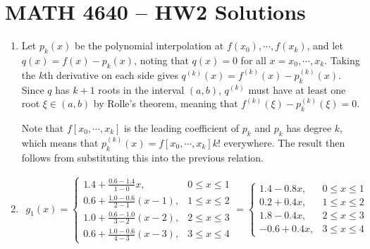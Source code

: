\documentclass[a4paper,12pt]{article}
\begin{document}
\section*{MATH 4640 -- HW2 Solutions}
\begin{enumerate}
    \item
        Let $p_k(x)$ be the polynomial interpolation at $f(x_0), \cdots, f(x_k)$, and let $q(x) = f(x) - p_k(x)$, noting that $q(x) = 0$ for all $x = x_0, \cdots, x_k$. Taking the $k$th derivative on each side gives $q^{(k)}(x) = f^{(k)}(x) - p_k^{(k)}(x)$. Since $q$ has $k + 1$ roots in the interval $(a, b)$, $q^{(k)}$ must have at least one root $\xi \in (a, b)$ by Rolle's theorem, meaning that $f^{(k)}(\xi) - p_k^{(k)}(\xi) = 0$. \par
        Note that $f[x_0, \cdots, x_k]$ is the leading coefficient of $p_k$ and $p_k$ has degree $k$, which means that $p_k^{(k)}(x) = f[x_0, \cdots, x_k]k!$ everywhere. The result then follows from substituting this into the previous relation.

    \item
        \begin{align*}
            g_1(x) = \begin{cases}
                1.4 + \frac{0.6 - 1.4}{1 - 0}x, &0 \leq x \leq 1 \\
                0.6 + \frac{1.0 - 0.6}{2 - 1}(x - 1), &1 \leq x \leq 2 \\
                1.0 + \frac{0.6 - 1.0}{3 - 2}(x - 2), &2 \leq x \leq 3 \\
                0.6 + \frac{1.0 - 0.6}{4 - 3}(x - 3), &3 \leq x \leq 4
            \end{cases}
            = \begin{cases}
                1.4 - 0.8x, &0 \leq x \leq 1 \\
                0.2 + 0.4x, &1 \leq x \leq 2 \\
                1.8 - 0.4x, &2 \leq x \leq 3 \\
                -0.6 + 0.4x, &3 \leq x \leq 4
            \end{cases}
        \end{align*}


\end{enumerate}
\end{document}
